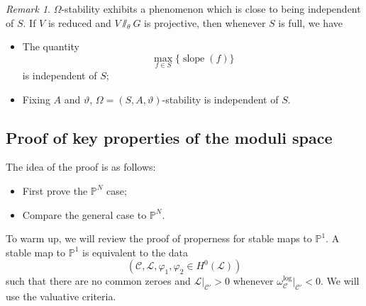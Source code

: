 \documentclass[10pt]{amsart}
\theoremstyle{definition}
\theoremstyle{remark}
\newtheorem{rmk}[thm]{Remark}
\theoremstyle{plain}
\theoremstyle{definition}
\theoremstyle{remark}
\renewcommand{\P}{\mathbb{P}}
\newcommand{\mc}[1]{\mathcal{#1}}
\newcommand{\on}[1]{\operatorname{#1}}
\newcommand{\1}{\mathbf{1}}
\newcommand{\2}{\mathbf{2}}
\newcommand{\3}{\mathbf{3}}
\begin{document}
\begin{rmk}
    $\Omega$-stability exhibits a phenomenon which is close to being independent of $S$. If $V$ is reduced and $V \sslash_{\theta} G$ is projective, then whenever $S$ is full, we have
    \begin{itemize}
        \item The quantity
            \[ \max_{f \in S} \{ \on{slope}(f)\} \]
            is independent of $S$;
        \item Fixing $A$ and $\vartheta$, $\Omega = (S,A,\vartheta)$-stability is independent of $S$.
    \end{itemize}
\end{rmk}

\subsection{Proof of key properties of the moduli space}%
\label{sub:Proof of key properties of the moduli space}

The idea of the proof is as follows:
\begin{itemize}
    \item First prove the $\P^N$ case;
    \item Compare the general case to $\P^N$.
\end{itemize}

To warm up, we will review the proof of properness for stable maps to $\P^1$. A stable map to $\P^1$ is equivalent to the data 
\[ (\mc{C}, \mc{L}, \varphi_1, \varphi_2 \in H^0(\mc{L})) \]
such that there are no common zeroes and $\mc{L}|_{\mc{C}'} > 0$ whenever $\omega_{\mc{C}}^{\log}|_{\mc{C}'} < 0$. We will use the valuative criteria.
\end{document}
